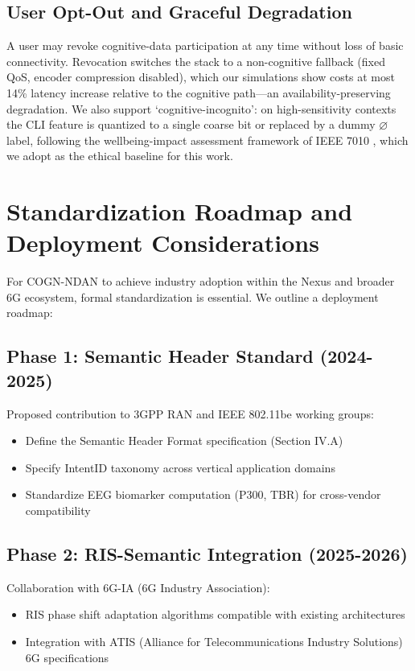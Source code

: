 \documentclass[journal]{IEEEtran}
\newcommand{\COGN}{COGN-NDAN}
\begin{document}
\subsection{User Opt-Out and Graceful Degradation}
A user may revoke cognitive-data participation at any time without loss of basic connectivity. Revocation switches the stack to a non-cognitive fallback (fixed QoS, encoder compression disabled), which our simulations show costs at most 14\% latency increase relative to the cognitive path---an availability-preserving degradation. We also support `cognitive-incognito': on high-sensitivity contexts the CLI feature is quantized to a single coarse bit or replaced by a dummy $\varnothing$ label, following the wellbeing-impact assessment framework of IEEE 7010 \cite{ieee7010}, which we adopt as the ethical baseline for this work.

\section{Standardization Roadmap and Deployment Considerations}

For \COGN{} to achieve industry adoption within the Nexus and broader 6G ecosystem, formal standardization is essential. We outline a deployment roadmap:

\subsection{Phase 1: Semantic Header Standard (2024-2025)}
Proposed contribution to 3GPP RAN and IEEE 802.11be working groups:
\begin{itemize}
    \item Define the Semantic Header Format specification (Section IV.A)
    \item Specify IntentID taxonomy across vertical application domains
    \item Standardize EEG biomarker computation (P300, TBR) for cross-vendor compatibility
\end{itemize}

\subsection{Phase 2: RIS-Semantic Integration (2025-2026)}
Collaboration with 6G-IA (6G Industry Association):
\begin{itemize}
    \item RIS phase shift adaptation algorithms compatible with existing architectures
    \item Integration with ATIS (Alliance for Telecommunications Industry Solutions) 6G specifications
\end{itemize}
\end{document}
